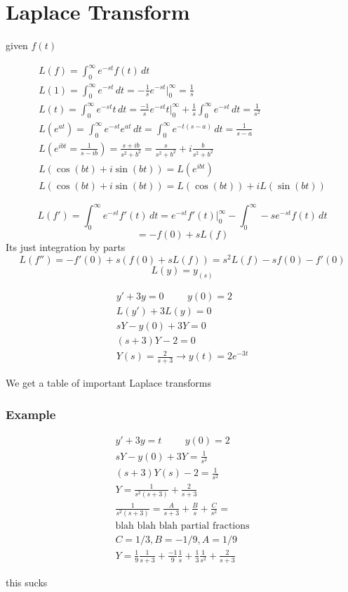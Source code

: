 \documentclass[fleqn]{report}
\newcommand{\hp}{\hspace{1cm}}
\newcommand{\equations} [1] {
\begin{gather*}
#1
\end{gather*}
}
\begin{document}
 
 \chapter{Laplace Transform}
 given $f(t)$
\equations{
 L(f) = \int^{\infty}_0
 e^{-st} f(t) \, dt
 \\
 L(1) = \int^{\infty}_0
 e^{-st} \, dt
 =
 -\frac{1}{s} e^{-st} \Big|^\infty_0
 =
 \frac{1}{s}
 \\
 L(t) = 
 \int^{\infty}_0
 e^{-st} t \, dt
 =
 \frac{-1}{s} e^{-st} t \Big|^\infty_0
 +
 \frac{1}{s}
\int^{\infty}_0 e^{-st} \, dt
=
\frac{1}{s^2}
\\
 L(e^{at}) 
 =
 \int^{\infty}_0
 e^{-st} e^{at} \, dt
 =
  \int^{\infty}_0
 e^{-t(s - a)} \, dt
 =
\frac{1}{s - a}
\\
 L(e^{ibt} = \frac{1}{s - ib})
 =
 \frac{s + ib}{s^2 + b^2}
 =
 \frac{s }{s^2 + b^2}
 +
i \frac{b}{s^2 + b^2} 
\\
L( \cos (bt) + i \sin (bt)) = L(e^{ibt})
\\
L( \cos (bt) + i \sin (bt)) = L(\cos (bt)) + i L (\sin (bt))
}
\newpage
\[
L(f') = \int^\infty_0 e^{-st} f'(t) \, dt
=
e^{-st} f'(t) \Big|^\infty_0
-
\int^\infty_0 -s e^{-st} f(t) \, dt
\]
\[
= -f(0) + s L(f)
\]
Its just integration by parts
\[
L(f'') = -f'(0) + s (f(0) + s L(f) )
=
s^2 L(f) - s f(0) - f'(0)
\]
\[
L(y) = y_{(s)}
\]
\equations{
y' + 3y = 0 
\hp
y(0) = 2 
\\
L(y') + 3L(y) = 0
\\
sY - y(0) + 3Y = 0
\\
(s + 3) Y - 2 = 0
\\
Y(s) = \frac{2}{s + 3}
\rightarrow
y(t) = 2 e^{-3t}
}
We get a table of important Laplace transforms

\subsection{Example}
\equations{
y' + 3y = t \hp y(0) = 2
\\
sY - y(0) + 3Y = \frac{1}{s^2}
\\
(s + 3)Y(s) - 2 = \frac{1}{s^2}
\\
Y = \frac{1}{s^2(s + 3)} + \frac{2}{s + 3}
\\
\frac{1}{s^2 (s + 3)} = \frac{A}{s + 3} + \frac{B}{s} + \frac{C}{s^2}
=
\\
\textrm{blah blah blah partial fractions}
\\
C = 1/3, B = -1/9, A = 1/9
\\
Y = \frac{1}{9} \frac{1}{s + 3} + \frac{-1}{9} \frac{1}{s} + \frac{1}{3} \frac{1 }{s^2} + \frac{2}{s + 3}
}
this sucks
\end{document}
